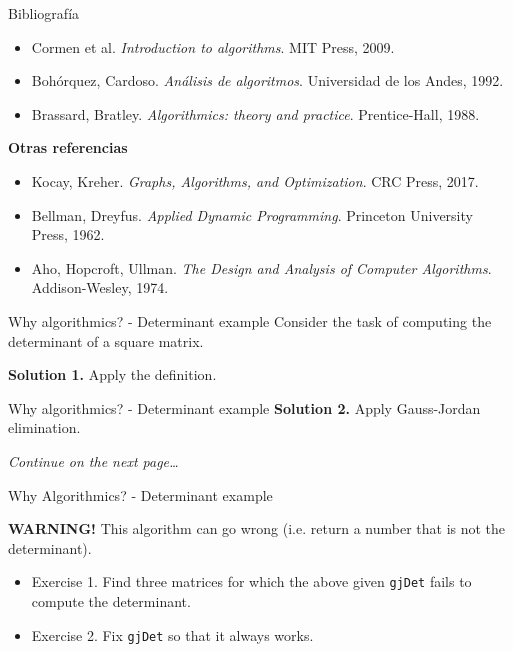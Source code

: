 \documentclass{beamer}
\begin{document}
%

\begin{frame}{Bibliografía}
\begin{itemize}
    \item Cormen et al. \textit{Introduction to algorithms}. MIT Press, 2009.
    \item Bohórquez, Cardoso. \textit{Análisis de algoritmos}. Universidad de los Andes, 1992. \pause
    \item Brassard, Bratley. \textit{Algorithmics: theory and practice}. Prentice-Hall, 1988. \smiley\smiley
\end{itemize}\pause

\bigskip

\textbf{Otras referencias}

\begin{itemize}
    \item Kocay, Kreher. \textit{Graphs, Algorithms, and Optimization}. CRC Press, 2017.
    \item Bellman, Dreyfus. \textit{Applied Dynamic Programming}. Princeton University Press, 1962.
    \item Aho, Hopcroft, Ullman. \textit{The Design and Analysis of Computer Algorithms}. Addison-Wesley, 1974.
\end{itemize}
\end{frame}

%

\begin{frame}{Why algorithmics? - Determinant example}
	Consider the task of computing the determinant of a square matrix.

	\textbf{Solution 1.} Apply the definition.

	
\end{frame}

%

\begin{frame}{Why algorithmics? - Determinant example}
	\textbf{Solution 2.} Apply Gauss-Jordan elimination.

	

	\textit{Continue on the next page\ldots}
\end{frame}

%

\begin{frame}{Why Algorithmics? - Determinant example}
	

	\textbf{WARNING!} This algorithm can go wrong (i.e. return a number that is
	not the determinant).
	\begin{itemize}
		\item Exercise 1. Find three matrices for which the above given \texttt{gjDet}
			fails to compute the determinant.
		\item Exercise 2. Fix \texttt{gjDet} so that it always works.
	\end{itemize}
\end{frame}
\end{document}
